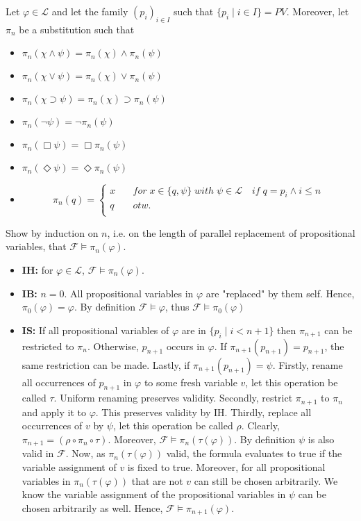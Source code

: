 \documentclass[11pt,a4paper]{article}
\newcommand{\lto}{\supset}
\newcommand{\some}{\Diamond}
\newcommand{\all}{\Box}
\begin{document}
\begin{enumerate}
\begin{enumerate}
Let $\varphi \in \mathcal{L}$ and let the family $(p_i)_{i \in I}$ such that $\{ p_i \mid i \in I\} = PV$. Moreover, let $\pi_n$ be a substitution such that
\begin{itemize}
\item $\pi_n(\chi \land \psi) = \pi_n(\chi) \land \pi_n(\psi) $
\item $\pi_n(\chi \lor \psi) = \pi_n(\chi) \lor \pi_n(\psi) $
\item $\pi_n(\chi \lto \psi) = \pi_n(\chi) \lto \pi_n(\psi) $
\item $\pi_n(\neg \psi) =\neg \pi_n(\psi) $
\item $\pi_n(\all \psi) =\all \pi_n(\psi) $
\item $\pi_n(\some \psi) =\some \pi_n(\psi) $
\item \begin{equation*}
\pi_n(q) = \begin{cases}
x  & \quad \mathit{for} \; x \in \{q, \psi\} \; \mathit{with} \; \psi \in \mathcal{L} \quad if \; q=p_i \land i\leq n\\
q & \quad otw.\\
\end{cases}
\end{equation*}
\end{itemize}

Show by induction on $n$, i.e. on the length of parallel replacement of propositional variables, that $\mathcal{F} \models \pi_n(\varphi)$. 
\begin{itemize}
\item \textbf{IH:}  for $\varphi \in \mathcal{L}$, $\mathcal{F} \models \pi_n(\varphi)$.
\item \textbf{IB:}  $n=0$. All propositional variables in $\varphi$ are "replaced" by them self. Hence, $\pi_0(\varphi)=\varphi$. By definition $\mathcal{F} \models \varphi$, thus  $\mathcal{F} \models \pi_0(\varphi)$
\item \textbf{IS:} If all propositional variables of $\varphi$ are in $\{p_i \mid i < n+1\}$ then $\pi_{n+1}$ can be restricted to $\pi_n$. Otherwise, $p_{n+1}$ occurs in $\varphi$. If $\pi_{n+1}(p_{n+1})=p_{n+1}$, the same restriction can be made. Lastly, if $\pi_{n+1}(p_{n+1})=\psi$. Firstly, rename all occurrences of $p_{n+1}$ in $\varphi$ to some fresh variable $v$, let this operation be called $\tau$. Uniform renaming preserves validity. Secondly, restrict $\pi_{n+1}$ to $\pi_n$ and apply it to $\varphi$. This preserves validity by IH. Thirdly, replace all occurrences of $v$ by $\psi$, let this operation be called $\rho$. Clearly, $\pi_{n+1}=(\rho \circ \pi_n \circ \tau)$. Moreover, $\mathcal{F} \models  \pi_n(\tau(\varphi))$. By definition $\psi$ is also valid in $\mathcal{F}$. Now, as $\pi_n(\tau(\varphi))$ valid, the formula evaluates to true if the variable assignment of $v$ is fixed to true. Moreover, for all propositional variables in $\pi_n(\tau(\varphi))$ that are not $v$ can still be chosen arbitrarily. We know the variable assignment of the propositional variables in $\psi$ can be chosen arbitrarily as well. Hence, $\mathcal{F} \models \pi_{n+1}(\varphi)$.
\end{itemize}


\end{enumerate}
\end{enumerate}
\end{document}
